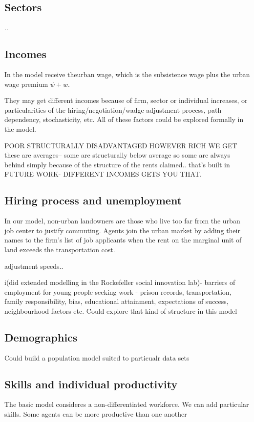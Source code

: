 \subsection{Sectors}
..


\subsection{Incomes}
In the model receive the\gls{urban wage}, which is the subsistence wage plus the urban wage premium $\psi + w$.

They may get different incomes because of firm, sector or individual increases, or particularities of the 
hiring/negotiation/wadge adjustment process, path dependency, stochasticity, etc. 
All of these factors could be explored formally in the model. %


POOR STRUCTURALLY DISADVANTAGED HOWEVER RICH WE GET
these are averages-- some are structurally below average so some are always behind simply because of the structure of the rents claimed.. that's built in FUTURE WORK- DIFFERENT INCOMES GETS YOU THAT. 



\subsection{Hiring process and unemployment} \label{section-rockefeller}
 In our model, non-urban landowners are those who live too far from the urban job center to justify commuting.  Agents join the urban market by adding their names to the firm's list of job applicants when the rent on the marginal unit of land exceeds the transportation cost. 

adjustment speeds..
 
i(did extended modelling in the Rockefeller social innovation lab)- barriers of employment for young people seeking work
- prison records, transportation, family responsibility, bias, educational attainment, expectations of success, neighbourhood factors etc.
Could explore that kind of structure in this model

\subsection{Demographics}
Could build a population model suited to particualr data sets %

\subsection{Skills and individual productivity}
The basic model consideres a non-differentiated workforce. We can add particular skills.
Some agents can be more productive than one another

